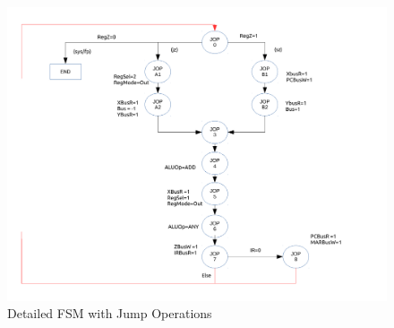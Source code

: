\documentclass[conference]{IEEEtran}
\begin{document}
\begin{figure}[!t]
\centering
\includegraphics[width=\textwidth]{ControlFSMp2.pdf}
\caption{Detailed FSM with Jump Operations}
\label{fig_sim}
\end{figure}
\end{document}
